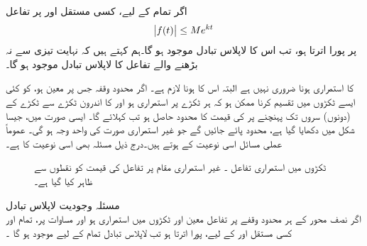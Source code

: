 اگر تمام   کے لیے، کسی مستقل  اور  پر تفاعل  
\begin{align}\label{مساوات_لاپلاس_بڑھنے_کی_حد}
\abs{f(t)} \le M e^{kt}
\end{align}
پر پورا اترتا ہو، تب اس کا لاپلاس تبادل موجود ہو گا۔ہم کہتے ہیں کہ نہایت تیزی سے نہ بڑھنے والے  تفاعل  کا لاپلاس تبادل موجود ہو گا۔

 کا استمراری  ہونا ضروری نہیں ہے البتہ اس کا  ہونا لازم ہے۔  اگر محدود وقفہ  جس پر  معین ہو، کو کئی ایسے ٹکڑوں میں تقسیم کرنا ممکن ہو کہ ہر ٹکڑے پر  استمراری ہو اور  کا اندرون ٹکڑے سے ٹکڑے کے (دونوں) سروں تک پہنچنے پر   کی قیمت کا  محدود حاصل ہو تب   کہلائے گا۔ ایسی صورت میں، جیسا شکل  میں دکھایا گیا ہے، محدود  پائے جائیں گے جو غیر استمراری صورت کی واحد وجہ ہو گی۔ عموماً عملی مسائل اسی نوعیت کے ہوتے ہیں۔درج ذیل مسئلہ بھی اسی نوعیت کا ہے۔ 
\begin{figure}
\centering
{}
\caption{ٹکڑوں میں استمراری تفاعل ۔ غیر استمراری مقام پر تفاعل کی قیمت کو نقطوں سے ظاہر کیا گیا ہے۔}
\label{شکل_لاپلاس_ٹکڑوں_استمراری}
\end{figure}

\quad مسئلہ وجودیت لاپلاس تبادل\\
اگر نصف محور  کے ہر محدود وقفے پر تفاعل  معین اور ٹکڑوں میں استمراری ہو اور مساوات  پر، 
تمام  اور کسی مستقل  اور  کے لیے،  پورا اترتا ہو تب لاپلاس تبادل  تمام  کے لیے موجود ہو گا ۔ 

